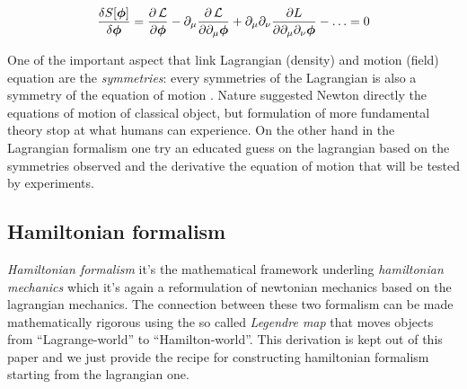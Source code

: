 \begin{equation} \label{eq:euler-lagrange-field}
  \frac{\delta S[\bm{\phi}]}{\delta \bm{\phi}} =
    \frac{\partial \operatorname{\mathcal{L}}}{\partial \bm{\phi}} -
    \partial_{\mu} \frac{\partial \operatorname{\mathcal{L}}}{\partial \partial_{\mu}\bm{\phi}} +
    \partial_{\mu}\partial_{\nu}\frac{\partial L}
    {\partial \partial_{\mu}\partial_{\nu}\bm{\phi}} -
    \ldots = 0
\end{equation}

One of the important aspect that link Lagrangian (density) and motion (field)
equation are the \emph{symmetries}: every symmetries of the Lagrangian is also a
symmetry of the equation of motion \cite{Aldrovandi19_symmetry}. Nature
suggested Newton directly the equations of motion of classical object, but
formulation of more fundamental theory stop at what humans can experience. On
the other hand in the Lagrangian formalism one try an educated guess on the
lagrangian based on the symmetries observed and the derivative the equation of
motion that will be tested by experiments.


\subsection{Hamiltonian formalism}
\emph{Hamiltonian formalism} it's the mathematical framework underling
\emph{hamiltonian mechanics} which it's again a reformulation of newtonian
mechanics based on the lagrangian mechanics. The connection between these two
formalism can be made mathematically rigorous using the so called \emph{Legendre
map} that moves objects from ``Lagrange-world'' to ``Hamilton-world''. This
derivation is kept out of this paper and we just provide the recipe for
constructing hamiltonian formalism starting from the lagrangian one.

